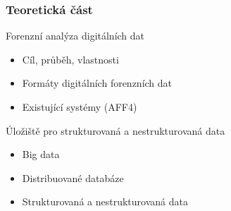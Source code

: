 \documentclass[10pt,xcolor=pdflatex]{beamer}
\begin{document}
\begin{frame}\frametitle{Teoretická část}
\begin{block}{Forenzní analýza digitálních dat}
    \begin{itemize}
        \item Cíl, průběh, vlastnosti
        \item Formáty digitálních forenzních dat
        \item Existující systémy (AFF4)
    \end{itemize}
\end{block}
\begin{block}{Úložiště pro strukturovaná a nestrukturovaná data}
    \begin{itemize}
        \item Big data
        \item Distribuované databáze
        \item Strukturovaná a nestrukturovaná data
    \end{itemize}
\end{block}
\end{frame}

\end{document}
